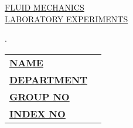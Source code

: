 \documentclass[12pt,a4paper]{article}
\begin{document}
\begin{titlepage}
	
	\begin{flushright}
	\end{flushright}
	
	\vspace*{\fill}
	\begin{center}
		\uppercase{\fontsize{30}{45}\selectfont \ul{Fluid Mechanics}}\\
		\uppercase{\fontsize{20}{30}\selectfont \ul{Laboratory Experiments}}
	\end{center}
	\vfill %
	\begin{multicols}{2}
        .\\
		
		\columnbreak	
		\begin{tabular}{ll}
			\vspace{6pt}
			
			\textbf{\uppercase{\underline{Name}}}       &
			\textbf{\uppercase{\fontsize{12}{18} \selectfont {:}}} 
			{\fontsize{12}{18} \selectfont {Sivalakshan G}}      \\
			
			\vspace{6pt}
			\textbf{\uppercase{\underline{Department}}} &
			\textbf{\uppercase{\fontsize{12}{18} \selectfont {:}}} 
			{\fontsize{12}{18} \selectfont {Engineering Tech.}}\\
			
			\vspace{6pt}
			\textbf{\uppercase{\underline{Group No}}}   &
			\textbf{\uppercase{\fontsize{12}{18} \selectfont {:}}} 
			{\fontsize{12}{18} \selectfont {MG9}}  \\

			\vspace{6pt}
			\textbf{\uppercase{\underline{Index No}}}   &
			\textbf{\uppercase{\fontsize{12}{18} \selectfont {:}}} 
			{\fontsize{12}{18} \selectfont {EGT/16/00131}}  \\
			
			
		\end{tabular}
	\end{multicols}
	
\end{titlepage}
\end{document}
